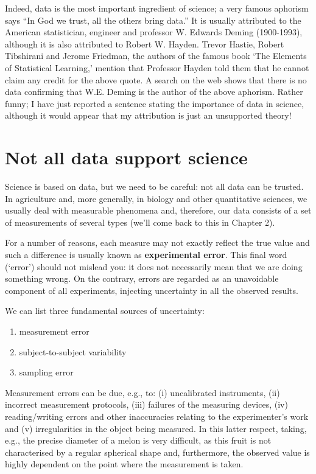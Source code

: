 \documentclass[a4paper,12pt,oneside]{book}
\providecommand{\tightlist}{%
  \setlength{\itemsep}{0pt}\setlength{\parskip}{0pt}}
\begin{document}
Indeed, data is the most important ingredient of science; a very famous aphorism says ``In God we trust, all the others bring data.'' It is usually attributed to the American statistician, engineer and professor W. Edwards Deming (1900-1993), although it is also attributed to Robert W. Hayden. Trevor Hastie, Robert Tibshirani and Jerome Friedman, the authors of the famous book `The Elements of Statistical Learning,' mention that Professor Hayden told them that he cannot claim any credit for the above quote. A search on the web shows that there is no data confirming that W.E. Deming is the author of the above aphorism. Rather funny; I have just reported a sentence stating the importance of data in science, although it would appear that my attribution is just an unsupported theory!

\hypertarget{not-all-data-support-science}{%
\section{Not all data support science}\label{not-all-data-support-science}}

Science is based on data, but we need to be careful: not all data can be trusted. In agriculture and, more generally, in biology and other quantitative sciences, we usually deal with measurable phenomena and, therefore, our data consists of a set of measurements of several types (we'll come back to this in Chapter 2).

For a number of reasons, each measure may not exactly reflect the true value and such a difference is usually known as \textbf{experimental error}. This final word (`error') should not mislead you: it does not necessarily mean that we are doing something wrong. On the contrary, errors are regarded as an unavoidable component of all experiments, injecting uncertainty in all the observed results.

We can list three fundamental sources of uncertainty:

\begin{enumerate}
\def\labelenumi{\arabic{enumi}.}
\tightlist
\item
  measurement error
\item
  subject-to-subject variability
\item
  sampling error
\end{enumerate}

Measurement errors can be due, e.g., to: (i) uncalibrated instruments, (ii) incorrect measurement protocols, (iii) failures of the measuring devices, (iv) reading/writing errors and other inaccuracies relating to the experimenter's work and (v) irregularities in the object being measured. In this latter respect, taking, e.g., the precise diameter of a melon is very difficult, as this fruit is not characterised by a regular spherical shape and, furthermore, the observed value is highly dependent on the point where the measurement is taken.
\end{document}
